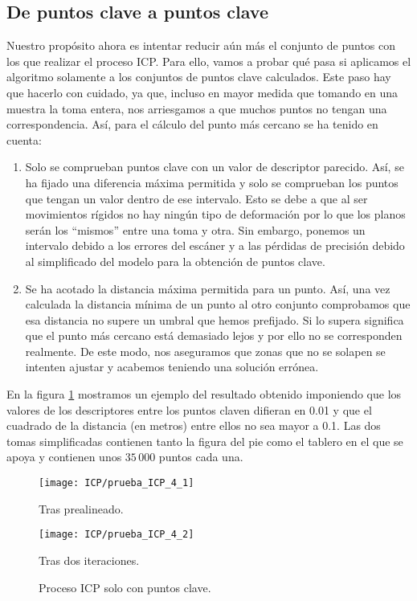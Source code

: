 \subsection{De puntos clave a puntos clave}
Nuestro propósito ahora es intentar reducir aún más el conjunto de puntos con los que realizar el proceso ICP. Para ello, vamos a probar qué pasa si aplicamos el algoritmo solamente a los conjuntos de puntos clave calculados. Este paso hay que hacerlo con cuidado, ya que, incluso en mayor medida que tomando en una muestra la toma entera, nos arriesgamos a que muchos puntos no tengan una correspondencia. Así, para el cálculo del punto más cercano se ha tenido en cuenta: 

\begin{enumerate}
\item Solo se comprueban puntos clave con un valor de descriptor parecido. Así, se ha fijado una diferencia máxima permitida y solo se comprueban los puntos que tengan un valor dentro de ese intervalo. Esto se debe a que al ser movimientos rígidos no hay ningún tipo de deformación por lo que los planos serán los ``mismos'' entre una toma y otra. Sin embargo, ponemos un intervalo debido a los errores del escáner y a las pérdidas de precisión debido al simplificado del modelo para la obtención de puntos clave.
\item Se ha acotado la distancia máxima permitida para un punto. Así, una vez calculada la distancia mínima de un punto al otro conjunto comprobamos que esa distancia no supere un umbral que hemos prefijado. Si lo supera significa que el punto más cercano está demasiado lejos y por ello no se corresponden realmente. De este modo, nos aseguramos que zonas que no se solapen se intenten ajustar y acabemos teniendo una solución errónea. 
\end{enumerate}

En la figura \ref{fig:KPKPICP} mostramos un ejemplo del resultado obtenido imponiendo que los valores de los descriptores entre los puntos claven difieran en 0.01 y que el cuadrado de la distancia (en metros) entre ellos no sea mayor a 0.1. Las dos tomas simplificadas contienen tanto la figura del pie como el tablero en el que se apoya y contienen unos $ 35\,000 $ puntos cada una.\\

\begin{figure}[h!]
	
	\begin{minipage}[b]{0.5\textwidth}
		\centering
		\texttt{[image: ICP/prueba\_ICP\_4\_1]} 
		\caption*{Tras prealineado.}
	\end{minipage}
	\begin{minipage}[b]{0.5\textwidth}
		\centering
		\texttt{[image: ICP/prueba\_ICP\_4\_2]}
		\caption*{Tras dos iteraciones.}
	\end{minipage}
	\caption{Proceso ICP solo con puntos clave.}
	\label{fig:KPKPICP}
\end{figure}

